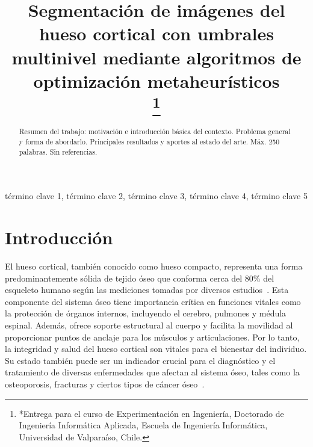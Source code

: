 \documentclass[conference]{IEEEtran}
\begin{document}
\title{Segmentación de imágenes del hueso cortical con umbrales multinivel mediante algoritmos de optimización metaheurísticos\\
\thanks{*Entrega para el curso de Experimentación en Ingeniería, Doctorado de Ingeniería Informática Aplicada, Escuela de Ingeniería Informática, Universidad de Valparaíso, Chile.}
}

\author{
\and
{}
}

\maketitle

\begin{abstract}
Resumen del trabajo: motivación e introducción básica del contexto. Problema general y forma de abordarlo. Principales resultados y aportes al estado del arte. Máx. 250 palabras. Sin referencias.
\end{abstract}

\begin{IEEEkeywords}
término clave 1, término clave 2, término clave 3, término clave 4, término clave 5
\end{IEEEkeywords}

\section{Introducción}

El hueso cortical, también conocido como hueso compacto, representa una forma predominantemente sólida de tejido óseo que conforma cerca del 80\% del esqueleto humano según las mediciones tomadas por diversos estudios~\cite{nyman2008measurements}. Esta componente del sistema óseo tiene importancia crítica en funciones vitales como la protección de órganos internos, incluyendo el cerebro, pulmones y médula espinal. Además, ofrece soporte estructural al cuerpo y facilita la movilidad al proporcionar puntos de anclaje para los músculos y articulaciones. Por lo tanto, la integridad y salud del hueso cortical son vitales para el bienestar del individuo. Su estado también puede ser un indicador crucial para el diagnóstico y el tratamiento de diversas enfermedades que afectan al sistema óseo, tales como la osteoporosis, fracturas y ciertos tipos de cáncer óseo~\cite{nyman2008measurements}.
\end{document}
